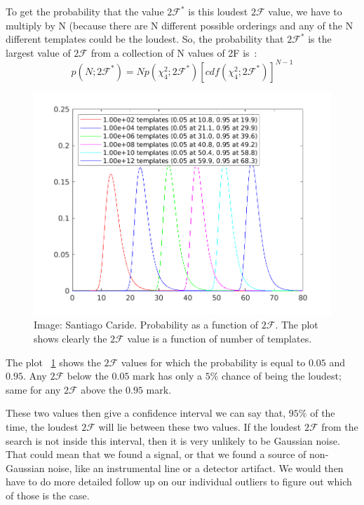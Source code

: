 \documentclass{ttuthes2007}
\begin{document}
To get the probability that the value $2\mathcal{F}^*$  is this loudest
$2\mathcal{F}$ value, we have to multiply by N (because there are N different
possible orderings and any of the N different templates could be the loudest. So,
the probability that $2\mathcal{F}^*$ is the largest value of $2\mathcal{F}$ from a
collection of N values of 2F is~\cite{Abadie_2010, Wette:2009uea}:
\begin{equation}                                                                
p(N;2\mathcal{F}^*)=
Np(\chi^2_4;2\mathcal{F}^*)[cdf(\chi^2_4;2\mathcal{F}^*)]^{N-1} 
\end{equation}

\begin{figure}[bht!]                                                            
        \includegraphics[width=\textwidth]{figure/2F_max.png}                  
        \caption{Image: Santiago Caride. Probability as a function of
                 $2\mathcal{F}$. The
                 plot shows clearly the $2\mathcal{F}$ value is a function of number of  templates.}                             
        \label{fig:2F_max}                                                  
\end{figure} 
The plot ~\ref{fig:2F_max} shows the
$2\mathcal{F}$ values for which the probability is equal to $0.05$ and $0.95$.
Any $2\mathcal{F}$ below the $0.05$ mark has only a $5\%$ chance of being the
loudest; same for any $2\mathcal{F}$ above the $0.95$ mark.

These two values then give a confidence interval we can say that, $95\%$ of
the time, the loudest  $2\mathcal{F}$ will lie between these two values. If the
loudest  $2\mathcal{F}$ from the search is not inside this interval, then it is
very unlikely to be Gaussian noise. That could mean that we found a signal, or
that we found a source of non-Gaussian noise, like an instrumental line or a
detector artifact. We would then have to do more detailed follow up on our
individual outliers to figure out which of those is the case.
\end{document}
